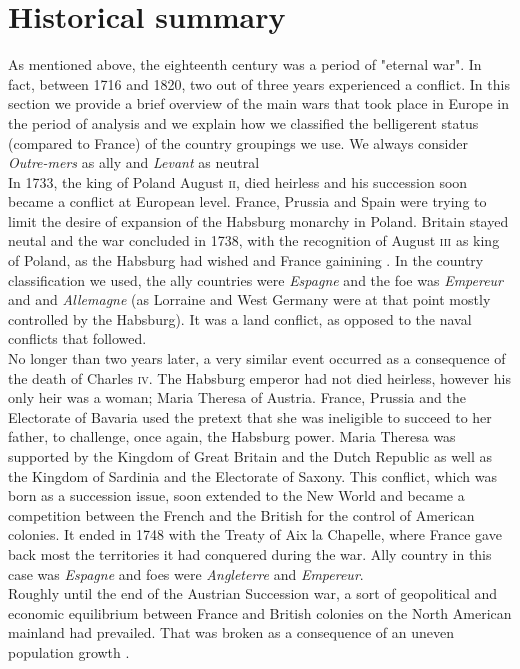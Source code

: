 \documentclass[12pt,a4paper,notitlepage,english]{article}
\begin{document}
\section{Historical summary} \label{historical_summary}
As mentioned above, the eighteenth century was a period of "eternal war".
In fact, between 1716 and 1820, two out of three years experienced a conflict.
In this section we provide a brief overview of the main wars that took place in Europe in the period of analysis and we explain how we classified the belligerent status (compared to France) of the country groupings we use. We always consider \textit{Outre-mers} as ally and \textit{Levant} as neutral\\
In 1733, the king of Poland August \textsc{ii}, died heirless and his succession soon became a conflict at European level.
France, Prussia and Spain were trying to limit the desire of expansion of the Habsburg monarchy in Poland. Britain stayed neutal and the war concluded in 1738, with the recognition of August \textsc{iii} as king of Poland, as the Habsburg had wished and France gainining .
In the country classification we used, the ally countries were \textit{Espagne}  and the foe was \textit{Empereur} and and \textit{Allemagne} (as Lorraine and West Germany were at that point mostly controlled by the Habsburg).
It was a land conflict, as opposed to the naval conflicts that followed. \\
No longer than two years later, a very similar event occurred as a consequence of the death of Charles \textsc{iv}.
The Habsburg emperor had not died heirless, however his only heir was a woman; Maria Theresa of Austria.
France, Prussia and the Electorate of Bavaria used the pretext that she was ineligible to succeed to her father, to challenge, once again, the Habsburg power.
Maria Theresa was supported by the Kingdom of Great Britain and the Dutch Republic as well as the Kingdom of Sardinia and the Electorate of Saxony.
This conflict, which was born as a succession issue, soon extended to the New World and became a competition between the French and the British for the control of American colonies.
It ended in 1748 with the Treaty of Aix la Chapelle, where France gave back most the territories it had conquered during the war.
Ally country in this case was \textit{Espagne} and foes were \textit{Angleterre} and \textit{Empereur}. \\
Roughly until the end of the Austrian Succession war, a sort of geopolitical and economic equilibrium between France and British colonies on the North American mainland had prevailed. That was broken as a consequence of an uneven population growth \citep{Findlay2009}.
\end{document}
